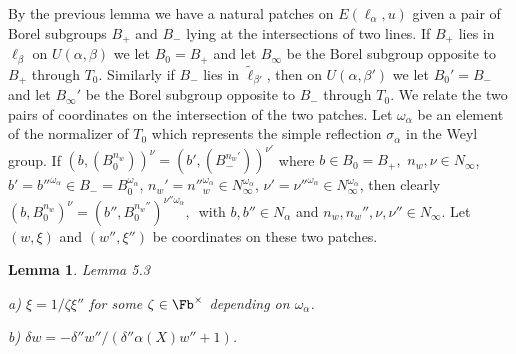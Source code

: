 \documentclass{memo-l}
\newtheorem{lemma}[theorem]{Lemma}
\theoremstyle{definition}
\theoremstyle{remark}
\numberwithin{section}{chapter}
\numberwithin{equation}{chapter}
\begin{document}
{\medskip}

   By the previous lemma we have a natural patches on
$E({\ell}_{{\alpha}},u)$ given a pair of Borel subgroups $B_{+}$ and
$B_{-}$ lying at the intersections of two lines.  If $B_{+}$ lies in
${\ell}_{{\beta}}$ on $U({\alpha},{\beta})$ we let $B_{0} = B_{+}$ and let
$B_{{\infty}}$ be the Borel subgroup opposite to $B_{+}$ through $T_{0}$.
Similarly if $B_{-}$ lies in $\tilde{\ell} _{{\beta}'}$, then on
$U({\alpha},{\beta}')$ we let $B_{0}' = B_{-}$ and let $B_{{\infty}}'$ be
the Borel subgroup opposite to $B_{-}$ through $T_{0}$.  We relate the two
pairs of coordinates on the intersection of the two patches.  Let
${\omega}_{\alpha}$ be an element of the normalizer of $T_{0}$ which
represents the simple reflection ${\sigma}_{{\alpha}}$ in the Weyl group.
If $(b,(B_{0}^{n_w}))^{\nu} = (b',(B_{-}^{n_{w}'}))^{\nu'}$ where
$b  \in  B_{0} = B_{+},$ $n_{w},{\nu}  \in
N_{{\infty}}$,
%
%
$b' = {b''}^{{\omega}_{{\alpha}}}  \in  B_{-} =
		B_{0}^{{\omega}_{{\alpha}}}$,
%
$n_{w}' = {n''}_{w}^{{\omega}_{{\alpha}}}  \in
		N_{{\infty}}^{{\omega}_{{\alpha}}}$,
%
${\nu}' = {\nu''}^{{\omega}_{{\alpha}}}
 \in  N_{{\infty}}^{{\omega}_{{\alpha}}}$,
%
%
then clearly $(b,B_{0}^{n_{w}})^{{\nu}} =
(b'',B_{0}^{n_{w}''})^{{\nu}''{\omega_{{\alpha}}}},$\ with $b,b''  \in
N_{{\alpha}}$ and $n_{w},n_{w}'',{\nu},{\nu}''  \in  N_{{\infty}}$.  Let
$(w,{\xi})$ and $(w'',{\xi}'')$ be coordinates on these two patches.

\medpagebreak

\begin{lemma}{Lemma 5.3}

\noindent
a) ${\xi} = 1/{\zeta}{\xi}''$ for some ${\zeta}  \in  \Fb^{\times}$ depending
on ${\omega}_{\alpha}$.

\noindent
b) ${\delta}w = -{\delta}''w''/({\delta}''{\alpha}(X)w''+1)$.
\end{lemma}

\medpagebreak
\end{document}
